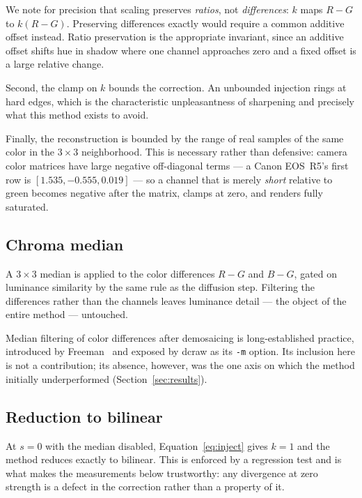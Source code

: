 \documentclass[10pt,a4paper]{article}
\begin{document}
We note for precision that scaling preserves \emph{ratios}, not
\emph{differences}: $k$ maps $R - G$ to $k(R-G)$. Preserving differences
exactly would require a common additive offset instead. Ratio preservation is
the appropriate invariant, since an additive offset shifts hue in shadow where
one channel approaches zero and a fixed offset is a large relative change.

Second, the clamp on $k$ bounds the correction. An unbounded injection rings at
hard edges, which is the characteristic unpleasantness of sharpening and
precisely what this method exists to avoid.

Finally, the reconstruction is bounded by the range of real samples of the same
color in the $3\times3$ neighborhood. This is necessary rather than
defensive: camera color matrices have large negative off-diagonal terms --- a
Canon EOS~R5's first row is $[1.535, -0.555, 0.019]$ --- so a channel that is
merely \emph{short} relative to green becomes negative after the matrix, clamps
at zero, and renders fully saturated.

\subsection{Chroma median}

A $3\times3$ median is applied to the color differences $R-G$ and $B-G$,
gated on luminance similarity by the same rule as the diffusion step. Filtering
the differences rather than the channels leaves luminance detail --- the object
of the entire method --- untouched.

Median filtering of color differences after demosaicing is long-established
practice, introduced by Freeman~\cite{freeman1988patent} and exposed by dcraw
as its \texttt{-m} option. Its inclusion here is not a contribution; its
absence, however, was the one axis on which the method initially underperformed
(Section~\ref{sec:results}).

\subsection{Reduction to bilinear}

At $s = 0$ with the median disabled, Equation~\ref{eq:inject} gives $k = 1$ and
the method reduces exactly to bilinear. This is enforced by a regression test
and is what makes the measurements below trustworthy: any divergence at zero
strength is a defect in the correction rather than a property of it.
\end{document}
